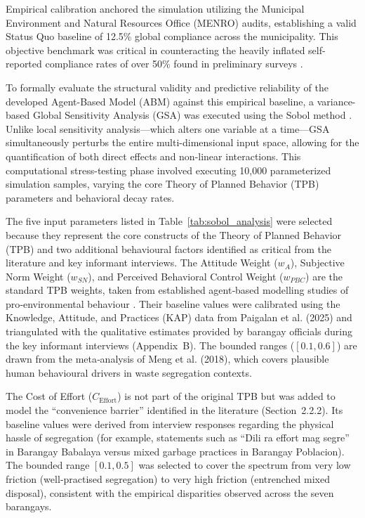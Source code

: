 
Empirical calibration anchored the simulation utilizing the Municipal Environment and Natural Resources Office (MENRO) audits, establishing a valid Status Quo baseline of 12.5\% global compliance across the municipality. This objective benchmark was critical in counteracting the heavily inflated self-reported compliance rates of over 50\% found in preliminary surveys \citep{Paigalan2025}. 

To formally evaluate the structural validity and predictive reliability of the developed Agent-Based Model (ABM) against this empirical baseline, a variance-based Global Sensitivity Analysis (GSA) was executed using the Sobol method \citep{Sobol2001}. Unlike local sensitivity analysis—which alters one variable at a time—GSA simultaneously perturbs the entire multi-dimensional input space, allowing for the quantification of both direct effects and non-linear interactions. This computational stress-testing phase involved executing 10,000 parameterized simulation samples, varying the core Theory of Planned Behavior (TPB) parameters and behavioral decay rates.

The five input parameters listed in Table~\ref{tab:sobol_analysis} were selected because they represent the core constructs of the Theory of Planned Behavior (TPB) and two additional behavioural factors identified as critical from the literature and key informant interviews. The Attitude Weight ($w_A$), Subjective Norm Weight ($w_{SN}$), and Perceived Behavioral Control Weight ($w_{PBC}$) are the standard TPB weights, taken from established agent‑based modelling studies of pro‑environmental behaviour \citep{Ceschi2021, Taraghi2025}. Their baseline values were calibrated using the Knowledge, Attitude, and Practices (KAP) data from Paigalan et al. (2025) and triangulated with the qualitative estimates provided by barangay officials during the key informant interviews (Appendix~B). The bounded ranges ($[0.1, 0.6]$) are drawn from the meta‑analysis of Meng et al. (2018), which covers plausible human behavioural drivers in waste segregation contexts.

The Cost of Effort ($C_{\text{Effort}}$) is not part of the original TPB but was added to model the “convenience barrier” identified in the literature (Section~2.2.2). Its baseline values were derived from interview responses regarding the physical hassle of segregation (for example, statements such as “Dili ra effort mag segre” in Barangay Babalaya versus mixed garbage practices in Barangay Poblacion). The bounded range $[0.1, 0.5]$ was selected to cover the spectrum from very low friction (well‑practised segregation) to very high friction (entrenched mixed disposal), consistent with the empirical disparities observed across the seven barangays.

